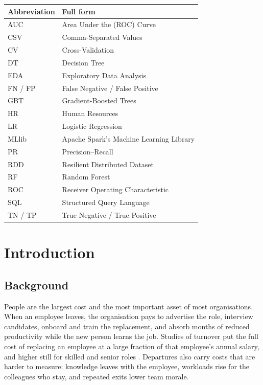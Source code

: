\documentclass[12pt,a4paper]{report}
\begin{document}
\begin{table}[H]
\centering
\begin{tabularx}{0.85\textwidth}{|P{3cm}|L|}
\hline
\textbf{Abbreviation} & \textbf{Full form} \\ \hline
AUC & Area Under the (ROC) Curve \\ \hline
CSV & Comma-Separated Values \\ \hline
CV & Cross-Validation \\ \hline
DT & Decision Tree \\ \hline
EDA & Exploratory Data Analysis \\ \hline
FN / FP & False Negative / False Positive \\ \hline
GBT & Gradient-Boosted Trees \\ \hline
HR & Human Resources \\ \hline
LR & Logistic Regression \\ \hline
MLlib & Apache Spark's Machine Learning Library \\ \hline
PR & Precision--Recall \\ \hline
RDD & Resilient Distributed Dataset \\ \hline
RF & Random Forest \\ \hline
ROC & Receiver Operating Characteristic \\ \hline
SQL & Structured Query Language \\ \hline
TN / TP & True Negative / True Positive \\ \hline
\end{tabularx}
\end{table}

\clearpage
{}


\chapter{Introduction}

\section{Background}

People are the largest cost and the most important asset of most organisations. When an employee leaves, the organisation pays to advertise the role, interview candidates, onboard and train the replacement, and absorb months of reduced productivity while the new person learns the job. Studies of turnover put the full cost of replacing an employee at a large fraction of that employee's annual salary, and higher still for skilled and senior roles \cite{allen2010retaining}. Departures also carry costs that are harder to measure: knowledge leaves with the employee, workloads rise for the colleagues who stay, and repeated exits lower team morale.
\end{document}

